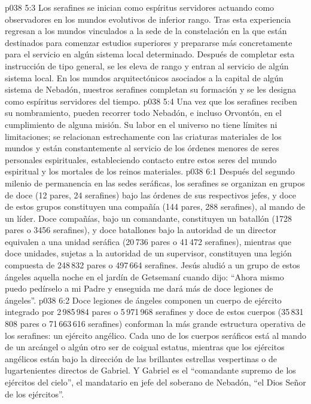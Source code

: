 \vs p038 5:3 Los serafines se inician como espíritus servidores actuando como observadores en los mundos evolutivos de inferior rango. Tras esta experiencia regresan a los mundos vinculados a la sede de la constelación en la que están destinados para comenzar estudios superiores y prepararse más concretamente para el servicio en algún sistema local determinado. Después de completar esta instrucción de tipo general, se les eleva de rango y entran al servicio de algún sistema local. En los mundos arquitectónicos asociados a la capital de algún sistema de Nebadón, nuestros serafines completan su formación y se les designa como espíritus servidores del tiempo.
\vs p038 5:4 Una vez que los serafines reciben su nombramiento, pueden recorrer todo Nebadón, e incluso Orvontón, en el cumplimiento de alguna misión. Su labor en el universo no tiene límites ni limitaciones; se relacionan estrechamente con las criaturas materiales de los mundos y están constantemente al servicio de los órdenes menores de seres personales espirituales, estableciendo contacto entre estos seres del mundo espiritual y los mortales de los reinos materiales.
\vs p038 6:1 Después del segundo milenio de permanencia en las sedes seráficas, los serafines se organizan en grupos de doce (12 pares, 24 serafines) bajo las órdenes de sus respectivos jefes, y doce de estos grupos constituyen una compañía (144 pares, 288 serafines), al mando de un líder. Doce compañías, bajo un comandante, constituyen un batallón (1728 pares o 3456 serafines), y doce batallones bajo la autoridad de un director equivalen a una unidad seráfica (20\,736 pares o 41\,472 serafines), mientras que doce unidades, sujetas a la autoridad de un supervisor, constituyen una legión compuesta de 248\,832 pares o 497\,664 serafines. Jesús aludió a un grupo de estos ángeles aquella noche en el jardín de Getsemaní cuando dijo: “Ahora mismo puedo pedírselo a mi Padre y enseguida me dará más de doce legiones de ángeles”.
\vs p038 6:2 Doce legiones de ángeles componen un cuerpo de ejército integrado por 2\,985\,984 pares o 5\,971\,968 serafines y doce de estos cuerpos (35\,831\,808 pares o 71\,663\,616 serafines) conforman la más grande estructura operativa de los serafines: un ejército angélico. Cada uno de los cuerpos seráficos está al mando de un arcángel o algún otro ser de coigual estatus, mientras que los ejércitos angélicos están bajo la dirección de las brillantes estrellas vespertinas o de lugartenientes directos de Gabriel. Y Gabriel es el “comandante supremo de los ejércitos del cielo”, el mandatario en jefe del soberano de Nebadón, “el Dios Señor de los ejércitos”.
